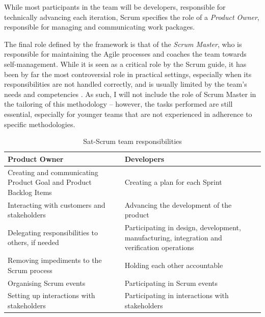 \documentclass[a4paper,nobib,justified,final]{tufte-book}
\begin{document}
While most participants in the team will be developers, responsible for technically advancing each iteration, Scrum specifies the role of a \emph{Product Owner}, responsible for managing and communicating work packages.

The final role defined by the framework is that of the \emph{Scrum Master}, who is responsible for maintaining the Agile processes and coaches the team towards self-management. While it is seen as a critical role by the Scrum guide, it has been by far the most controversial role in practical settings, especially when its responsibilities are not handled correctly, and is usually limited by the team's needs and competencies \autocite{kustersScreamGuide2020,doshiDownfallScrumMaster2025}. As such, I will not include the role of Scrum Master in the tailoring of this methodology -- however, the tasks performed are still essential, especially for younger teams that are not experienced in adherence to specific methodologies.

\begin{table}[h]
\begin{tabularx}{\linewidth}{@{}XX@{}}
	\toprule
 \textbf{Product Owner}                                            & \textbf{Developers}                                                                          \\ \midrule
	 Creating and communicating Product Goal and Product Backlog Items & Creating a plan for each Sprint                                                              \\
	 Interacting with customers and stakeholders                       & Advancing the development of the product                                                     \\
	 Delegating responsibilities to others, if needed                  & Participating in design, development, manufacturing, integration and verification operations \\
	 Removing impediments to the Scrum process                         & Holding each other accountable                                                               \\
	 Organising Scrum events                                           & Participating in Scrum events                                                                \\
	 Setting up interactions with stakeholders                         & Participating in interactions with stakeholders                            \\
	\bottomrule
\end{tabularx}
\caption{Sat-Scrum team responsibilities}
\end{table}
\end{document}

